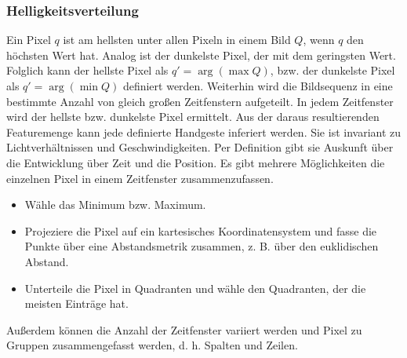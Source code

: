 \subsubsection{Helligkeitsverteilung}
Ein Pixel $q$ ist am hellsten unter allen Pixeln in einem Bild $Q$, wenn $q$ den höchsten Wert hat. Analog ist der dunkelste Pixel, der mit dem geringsten Wert. Folglich kann der hellste Pixel als
$q' = \arg(\max Q)$, bzw. der dunkelste Pixel als $q' = \arg(\min Q)$ definiert werden.
\newline
\newline
Weiterhin wird die Bildsequenz in eine bestimmte Anzahl von gleich großen Zeitfenstern aufgeteilt. In jedem Zeitfenster wird der hellste bzw. dunkelste Pixel ermittelt. Aus der daraus resultierenden
Featuremenge kann jede definierte Handgeste inferiert werden. Sie ist invariant zu Lichtverhältnissen und Geschwindigkeiten. Per Definition gibt sie Auskunft über die Entwicklung über Zeit und die Position.
\newline
\newline
Es gibt mehrere Möglichkeiten die einzelnen Pixel in einem Zeitfenster zusammenzufassen.
\begin{itemize}
    \item Wähle das Minimum bzw. Maximum.
    \item Projeziere die Pixel auf ein kartesisches Koordinatensystem und fasse die Punkte über eine Abstandsmetrik zusammen, z. B. über den euklidischen Abstand.
    \item Unterteile die Pixel in Quadranten und wähle den Quadranten, der die meisten Einträge hat.
\end{itemize}
Außerdem können die Anzahl der Zeitfenster variiert werden und Pixel zu Gruppen zusammengefasst werden, d. h. Spalten und Zeilen.

